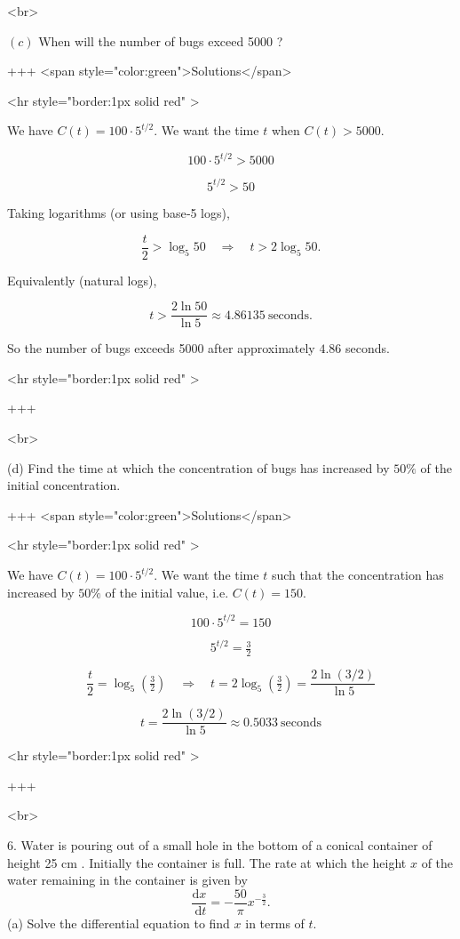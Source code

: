 <br>

\((c)\) When will the number of bugs exceed 5000 ?

+++ <span style="color:green">Solutions</span>

<hr style="border:1px solid red" >

We have $C(t)=100\cdot 5^{t/2}$. We want the time $t$ when $C(t)>5000$.


$$
100\cdot 5^{t/2}>5000
$$



$$
5^{t/2}>50
$$


Taking logarithms (or using base‑5 logs),


$$
\frac{t}{2}>\log_{5}50 \quad\Longrightarrow\quad t>2\log_{5}50.
$$


Equivalently (natural logs),


$$
t>\frac{2\ln 50}{\ln 5}\approx 4.86135\ \text{seconds}.
$$


So the number of bugs exceeds 5000 after approximately $4.86$ seconds.

<hr style="border:1px solid red" >

+++

<br>

(d) Find the time at which the concentration of bugs has increased by $50 \%$ of the initial concentration.

+++ <span style="color:green">Solutions</span>

<hr style="border:1px solid red" >

We have $C(t)=100\cdot 5^{t/2}$. We want the time $t$ such that the concentration has increased by $50\%$ of the initial value, i.e. $C(t)=150$.

$$
100\cdot 5^{t/2}=150
$$

$$
5^{t/2}=\tfrac{3}{2}
$$

$$
\frac{t}{2}=\log_{5}\!\left(\tfrac{3}{2}\right)
\quad\Longrightarrow\quad
t=2\log_{5}\!\left(\tfrac{3}{2}\right)
= \frac{2\ln(3/2)}{\ln 5}
$$

$$
t=\frac{2\ln(3/2)}{\ln 5}\approx 0.5033\ \text{seconds}
$$

<hr style="border:1px solid red" >

+++

<br>

6. Water is pouring out of a small hole in the bottom of a conical container of height 25 cm . Initially the container is full.
The rate at which the height $x$ of the water remaining in the container is given by
$$
\frac{\mathrm{d} x}{\mathrm{~d} t}=-\frac{50}{\pi} x^{-\frac{3}{2}} .
$$
(a) Solve the differential equation to find $x$ in terms of $t$.


